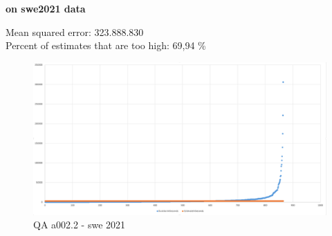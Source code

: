 \textbf{on swe2021 data}

Mean squared error: 323.888.830\\
Percent of estimates that are too high: 69,94 \%

\begin{figure}
\centering
\includegraphics{Documentation/10000-A002/a002_2-swe2021.png}
\caption{QA a002.2 - swe 2021}
\end{figure}
